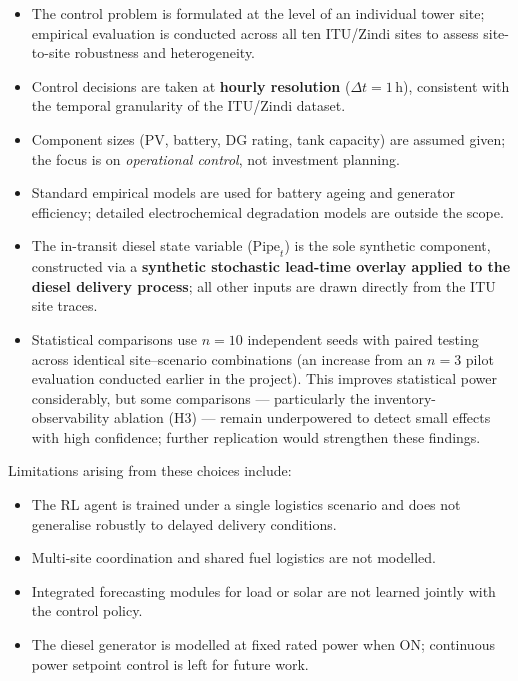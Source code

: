 \begin{itemize}
  \item The control problem is formulated at the level of an individual tower
  site; empirical evaluation is conducted across all ten ITU/Zindi sites to
  assess site-to-site robustness and heterogeneity.
  \item Control decisions are taken at \textbf{hourly resolution}
  ($\Delta t = 1$\,h), consistent with the temporal granularity of the
  ITU/Zindi dataset.
  \item Component sizes (PV, battery, DG rating, tank capacity) are assumed
  given; the focus is on \emph{operational control}, not investment planning.
  \item Standard empirical models are used for battery ageing and generator
  efficiency; detailed electrochemical degradation models are outside the scope.
  \item The in-transit diesel state variable ($\mathrm{Pipe}_t$) is the sole
  synthetic component, constructed via a \textbf{synthetic stochastic lead-time
  overlay applied to the diesel delivery process}; all other inputs are drawn
  directly from the ITU site traces.
  \item Statistical comparisons use $n = 10$ independent seeds with paired
  testing across identical site--scenario combinations (an increase from
  an $n=3$ pilot evaluation conducted earlier in the project). This
  improves statistical power considerably, but some comparisons ---
  particularly the inventory-observability ablation (H3) --- remain
  underpowered to detect small effects with high confidence; further
  replication would strengthen these findings.
\end{itemize}

Limitations arising from these choices include:

\begin{itemize}
  \item The RL agent is trained under a single logistics scenario and does not
  generalise robustly to delayed delivery conditions.
  \item Multi-site coordination and shared fuel logistics are not modelled.
  \item Integrated forecasting modules for load or solar are not learned jointly
  with the control policy.
  \item The diesel generator is modelled at fixed rated power when ON; continuous
  power setpoint control is left for future work.
\end{itemize}

